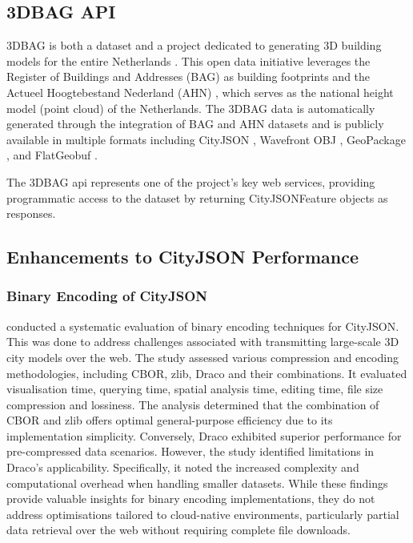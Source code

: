 \subsection{3DBAG API}
\label{rw:cityjson_enhancements:3dbag_api}

3DBAG is both a dataset and a project dedicated to generating 3D building models for the entire Netherlands \citep{3dbag}. This open data initiative leverages the Register of Buildings and Addresses (BAG) as building footprints and the Actueel Hoogtebestand Nederland (AHN) \citep{ahn}, which serves as the national height model (point cloud) of the Netherlands. The 3DBAG data is automatically generated through the integration of BAG and AHN datasets and is publicly available in multiple formats including CityJSON \citep{ledoux_2019}, Wavefront OBJ \citep{wavefront_obj}, GeoPackage \citep{geopackage}, and FlatGeobuf \citep{flatgeobuf}.

The 3DBAG \ac{api} \citep{3dbag_api} represents one of the project's key web services, providing programmatic access to the dataset by returning CityJSONFeature objects as responses.

\subsection{Enhancements to CityJSON Performance}
\label{rw:cityjson_enhancements:performance}

\subsubsection{Binary Encoding of CityJSON}
\label{rw:cityjson_enhancements:performance:binary_encoding}

\citet{jordi_van_liempt_2020} conducted a systematic evaluation of binary encoding techniques for CityJSON.
This was done to address challenges associated with transmitting large-scale 3D city models over the web.
The study assessed various compression and encoding methodologies, including CBOR, zlib, Draco and their combinations.
It evaluated visualisation time, querying time, spatial analysis time, editing time, file size compression and lossiness.
The analysis determined that the combination of CBOR and zlib offers optimal general-purpose efficiency due to its implementation simplicity.
Conversely, Draco exhibited superior performance for pre-compressed data scenarios.
However, the study identified limitations in Draco's applicability.
Specifically, it noted the increased complexity and computational overhead when handling smaller datasets.
While these findings provide valuable insights for binary encoding implementations, they do not address optimisations tailored to cloud-native environments, particularly partial data retrieval over the web without requiring complete file downloads.

